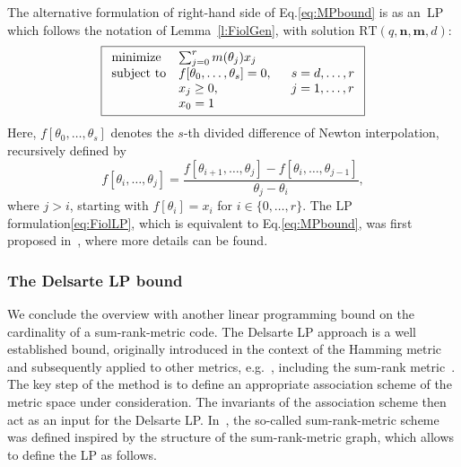 \documentclass[a4paper]{article}
\newcommand{\bfn}{\mathbf {n}}
\newcommand{\bfm}{\mathbf {m}}
\begin{document}
The alternative formulation of right-hand side of Eq.\:\eqref{eq:MPbound} is as an~LP which follows the notation of Lemma~\ref{l:FiolGen}, with solution $\mathrm{RT}(q,\bfn,\bfm,d)$:
\begin{equation}\label{eq:FiolLP}
\boxed{
\begin{array}{ll@{}l}
\text{minimize}  &\sum_{j=0}^{r} m(\theta_j)x_j &\\
\text{subject to} &f[\theta_0,\dots,\theta_s]=0, \ \quad \ & s=d,\dots,r\\
&x_j\geq0,~& j=1,\dots,r\\
& x_0=1 \\
\end{array}
}
\end{equation}
Here, \mbox{$f[\theta_0,\dots,\theta_s]$} denotes the $s$-th divided difference of Newton interpolation, 
recursively defined by $$f[\theta_i,\dots,\theta_j]=\frac{f[\theta_{i+1},\dots,\theta_j]-f[\theta_i,\dots,\theta_{j-1}]}{\theta_j-\theta_i},$$ where $j>i$, starting with \mbox{$f[\theta_i]=x_i$} for \mbox{$i\in\{0,\dots,r\}$.} The LP formulation\:\eqref{eq:FiolLP}, which is equivalent to Eq.\:\eqref{eq:MPbound}, was first proposed in~\cite{F2020}, where more details can be found.




\subsubsection{The Delsarte LP bound}\label{sec:DelsarteLPsrkcodes}
 
We conclude the overview with another linear programming bound on the cardinality of a sum-rank-metric code. The Delsarte LP approach is a well established bound, originally introduced in the context of the Hamming metric~\cite{DelsarteLP} and subsequently applied to other metrics, e.g.~\cite{D1978,delsarte1975alternating,DIL2020,A1982,S1986,R2010}, including the sum-rank metric~\cite{AGKP2024}. The key step of the method is to define an appropriate association scheme of the metric space under consideration. The invariants of the association scheme then act as an input for the Delsarte LP. In~\cite{AGKP2024}, the so-called sum-rank-metric scheme was defined inspired by the structure of the sum-rank-metric graph, which allows to define the LP as follows.
\end{document}
